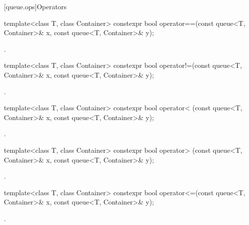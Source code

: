 [queue.ops]{Operators}

%
\begin{itemdecl}
template<class T, class Container>
  constexpr bool operator==(const queue<T, Container>& x, const queue<T, Container>& y);
\end{itemdecl}

\begin{itemdescr}
\pnum
\returns
{}.
\end{itemdescr}

%
\begin{itemdecl}
template<class T, class Container>
  constexpr bool operator!=(const queue<T, Container>& x,  const queue<T, Container>& y);
\end{itemdecl}

\begin{itemdescr}
\pnum
\returns
{}.
\end{itemdescr}

%
\begin{itemdecl}
template<class T, class Container>
  constexpr bool operator< (const queue<T, Container>& x, const queue<T, Container>& y);
\end{itemdecl}

\begin{itemdescr}
\pnum
\returns
{}.
\end{itemdescr}

%
\begin{itemdecl}
template<class T, class Container>
  constexpr bool operator> (const queue<T, Container>& x, const queue<T, Container>& y);
\end{itemdecl}

\begin{itemdescr}
\pnum
\returns
{}.
\end{itemdescr}

%
\begin{itemdecl}
template<class T, class Container>
  constexpr bool operator<=(const queue<T, Container>& x, const queue<T, Container>& y);
\end{itemdecl}

\begin{itemdescr}
\pnum
\returns
{}.
\end{itemdescr}

